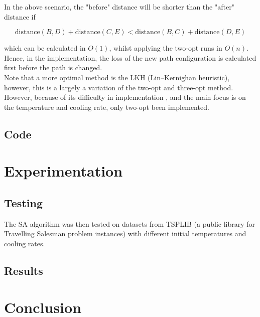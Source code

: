 \documentclass{article}
\begin{document}
In the above scenario, the "before" distance will be shorter than the "after" distance if

$$\text{distance}(B, D) + \text{distance}(C, E) < \text{distance}(B, C) + \text{distance}(D, E)$$

which can be calculated in $O(1)$, whilst applying the two-opt runs in $O(n)$.
Hence, in the implementation, the loss of the new path configuration is calculated first before the path is changed. \\

Note that a more optimal method is the LKH (Lin–Kernighan heuristic), however, this is a largely a variation of the two-opt and three-opt method.
However, because of its difficulty in implementation \cite{helsgaun98}, and the main focus is on the temperature and cooling rate, only two-opt been implemented.

\subsection{Code}

\newpage
\section{Experimentation}

\subsection{Testing}
The SA algorithm was then tested on datasets from TSPLIB \cite{tsplib} (a public library for Travelling Salesman problem instances) with different initial temperatures and cooling rates.

\subsection{Results}


\newpage
\section{Conclusion}

\newpage
\end{document}
